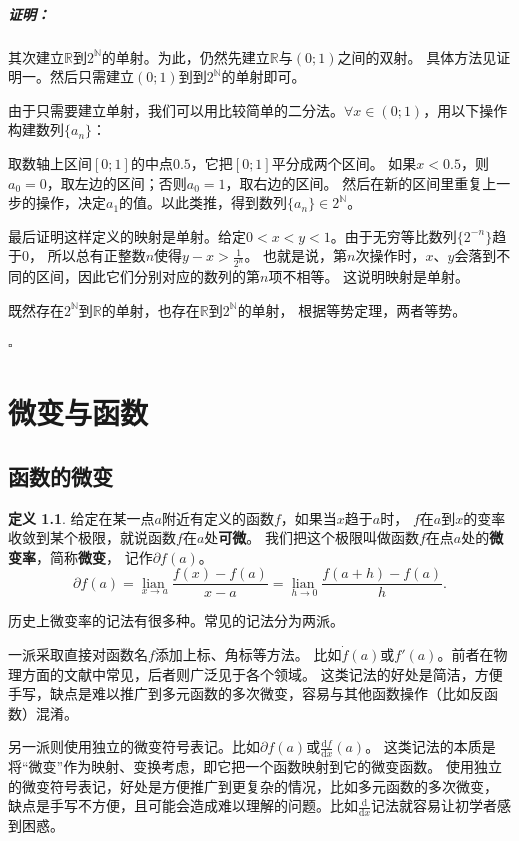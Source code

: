 \documentclass[12pt,UTF8]{ctexbook}
\newcommand{\lian}[1]{
    \underset{#1}{\operatorname{lian}\,}
}
\theoremstyle{definition}
\newtheorem{df}{定义}[section]
\theoremstyle{plain}
\renewenvironment{proof}{\paragraph{\textbf{证明：}}}{\hfill$\square$}
\begin{document}
\begin{appendix}
\begin{proof}
    其次建立$\mathbb{R}$到$2^\mathbb{N}$的单射。为此，仍然先建立$\mathbb{R}$与$(0;1)$之间的双射。
    具体方法见证明一。然后只需建立$(0;1)$到到$2^\mathbb{N}$的单射即可。

    由于只需要建立单射，我们可以用比较简单的二分法。$\forall x \in (0;1)$，用以下操作构建数列$\{a_n\}$：
    
    取数轴上区间$[0;1]$的中点$0.5$，它把$[0;1]$平分成两个区间。
    如果$x<0.5$，则$a_0=0$，取左边的区间；否则$a_0=1$，取右边的区间。
    然后在新的区间里重复上一步的操作，决定$a_1$的值。以此类推，得到数列$\{a_n\}\in 2^\mathbb{N}$。

    最后证明这样定义的映射是单射。给定$0 < x < y < 1$。由于无穷等比数列$\{2^{-n}\}$趋于$0$，
    所以总有正整数$n$使得$y - x > \frac{1}{2^n}$。
    也就是说，第$n$次操作时，$x$、$y$会落到不同的区间，因此它们分别对应的数列的第$n$项不相等。
    这说明映射是单射。

    既然存在$2^\mathbb{N}$到$\mathbb{R}$的单射，也存在$\mathbb{R}$到$2^\mathbb{N}$的单射，
    根据等势定理，两者等势。

\end{proof}

\chapter{微变与函数}

\section{函数的微变}

\begin{df}\label{df:b-1-0}
给定在某一点$a$附近有定义的函数$f$，如果当$x$趋于$a$时，
$f$在$a$到$x$的变率收敛到某个极限，就说函数$f$在$a$处\textbf{可微}。
我们把这个极限叫做函数$f$在点$a$处的\textbf{微变率}，简称\textbf{微变}，
记作$\partial f(a)$。
$$ \partial f(a) = \lian{x\to a} \frac{f(x) - f(a)}{x - a} = \lian{h\to 0} \frac{f(a + h) - f(a)}{h}.$$

历史上微变率的记法有很多种。常见的记法分为两派。

一派采取直接对函数名$f$添加上标、角标等方法。
比如$\dot{f}(a)$或$f'(a)$。前者在物理方面的文献中常见，后者则广泛见于各个领域。
这类记法的好处是简洁，方便手写，缺点是难以推广到多元函数的多次微变，容易与其他函数操作（比如反函数）混淆。

另一派则使用独立的微变符号表记。比如$\partial f(a)$或$\frac{\mathrm{d}f}{\mathrm{d}x}(a)$。
这类记法的本质是将“微变”作为映射、变换考虑，即它把一个函数映射到它的微变函数。
使用独立的微变符号表记，好处是方便推广到更复杂的情况，比如多元函数的多次微变，
缺点是手写不方便，且可能会造成难以理解的问题。比如$\frac{\mathrm{d}}{\mathrm{d}x}$记法就容易让初学者感到困惑。


\end{df}
\end{appendix}
\end{document}
